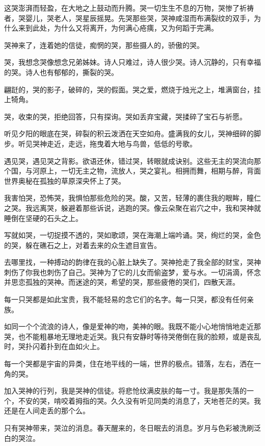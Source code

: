 \documentclass[UTF8]{article}
\begin{document}
\par 这哭澎湃而轻盈，在大地之上鼓动而升腾。哭一切生生不息的万物，哭惨了祈祷者，哭婴儿，哭老人，哭星辰摇晃。先哭那些哭，哭神咸湿而布满裂纹的双手，为什么来到此处，为什么又将离开，为何满心疮痍，又为何蹈于完满。
\par 哭神来了，连着她的信徒，痴惘的哭，那些摄人的，骄傲的哭。
\\[0.6cm]
\par 哭，我想念哭像想念兄弟姊妹。诗人只难过，诗人很少哭。诗人沉静的，只有幸福的哭。诗人也有郁郁的，撕裂的哭。
\par 翩跹的，哭的影子，破碎的，哭的假面。哭之爱，燃烧于烛光之上，堆满窗台，挂上犄角。
\par 哭，收束的哭，拒绝回答，只有探询。哭如丢弃宝藏，哭揉碎了宝石与祈愿。
\par 听见夕阳的眼底在哭，碎裂的积云泼洒在天空如舟。盛满我的女儿，哭神细碎的脚步。听见哭神走近，走远，拖曳着大地与鸟兽，低低的号歌。
\par 遇见哭，遇见哭之背影。欲语还休，错过哭，转眼就成诀别。这些无主的哭流向那个国，与河原上，一切无主之物，流放人，哭之宴礼。相拥而舞，相期与醉，背面世界奥秘在孤独的草原深央怀上了哭。
\par 我害怕哭，恐怖哭，我惧怕那些危险的哭。酸，又苦，轻薄的裹住我的眼眸，瞳仁之哭。我远离哭，躲避着那些诉说，逃跑的哭。像云朵聚在岩穴之中，我和哭神就睡倒在坚硬的石头之上。
\par 写就如哭，一切捉摸不透的，哭如歌颂，哭在海潮上端吟诵。哭，绚烂的哭，金色的哭，躲在礁石之上，对着去来的众生遮目宣告。
\par 去哪里找，一种搏动的韵律在我的心脏上缺失了。哭神抢走了我全部的财宝，哭神刺伤了你我也刺伤了自己。哭神为了它的儿女而偷盗梦，爱与水。一切涓滴，怀念并思恋孤独的哭神。而迷途的哭，希望的哭，那些疲倦的哭们，四散天涯。
\par 每一只哭都是如此宝贵，我不能轻易的念它们的名字。每一只哭，都没有任何亲族。
\par 如同一个个流浪的诗人，像是爱神的吻，美神的眼。我既不能小心地悄悄地走近那哭，也不能粗暴地无理地走近哭。我只有安静时等待哭倦倒在我的脸颊，或是丧乱时，哭扑闪着扑到在血如火上。
\par 每一个哭都是宇宙的异类，住在地平线的一端，世界的极点。错落，左右，洒在一角的哭。
\par 加入哭神的行列，我是哭神的信徒。将悲怆纹满皮肤的每一寸。我是那失落的一个，不安的哭，啃咬着拇指的哭。久久没有听见同类的消息了，天地苍茫的哭。我还是在人间走丢的那个么。
\par 只有哭神带来，哭泣的消息。春天醒来的，冬日眠去的消息。岁月与色彩被洗刷泛白的哭泣。
\end{document}
